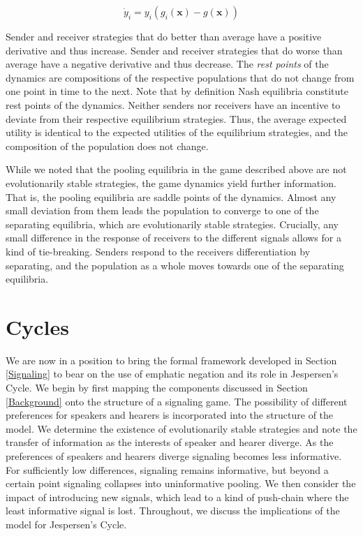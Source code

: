 \documentclass[12pt]{article}
\theoremstyle{definition} \newtheorem{definition}{Definition}
\begin{document}
\begin{equation}
     \dot{y}_i = y_i(g_i(\mathbf{x}) - g(\mathbf{x}))
\end{equation}

Sender and receiver strategies that do better than average have a positive derivative and thus increase. Sender and receiver strategies that do worse than average have a negative derivative and thus decrease. The \emph{rest points} of the dynamics are compositions of the respective populations that do not change from one point in time to the next. Note that by definition Nash equilibria constitute rest points of the dynamics. Neither senders nor receivers have an incentive to deviate from their respective equilibrium strategies. Thus, the average expected utility is identical to the expected utilities of the equilibrium strategies, and the composition of the population does not change.

While we noted that the pooling equilibria in the game described above are not evolutionarily stable strategies, the game dynamics yield further information. That is, the pooling equilibria are saddle points of the dynamics. Almost any small deviation from them leads the population to converge to one of the separating equilibria, which are evolutionarily stable strategies. Crucially, any small difference in the response of receivers to the different signals allows for a kind of tie-breaking. Senders respond to the receivers differentiation by separating, and the population as a whole moves towards one of the separating equilibria.



\section{Cycles}
\label{Cycles}

We are now in a position to bring the formal framework developed in Section \ref{Signaling} to bear on the use of emphatic negation and its role in Jespersen's Cycle. We begin by first mapping the components discussed in Section \ref{Background} onto the structure of a signaling game. The possibility of different preferences for speakers and hearers is incorporated into the structure of the model. We determine the existence of evolutionarily stable strategies and note the transfer of information as the interests of speaker and hearer diverge. As the preferences of speakers and hearers diverge signaling becomes less informative. For sufficiently low differences, signaling remains informative, but beyond a certain point signaling collapses into uninformative pooling. We then consider the impact of introducing new signals, which lead to a kind of push-chain where the least informative signal is lost. Throughout, we discuss the implications of the model for Jespersen's Cycle.
\end{document}
